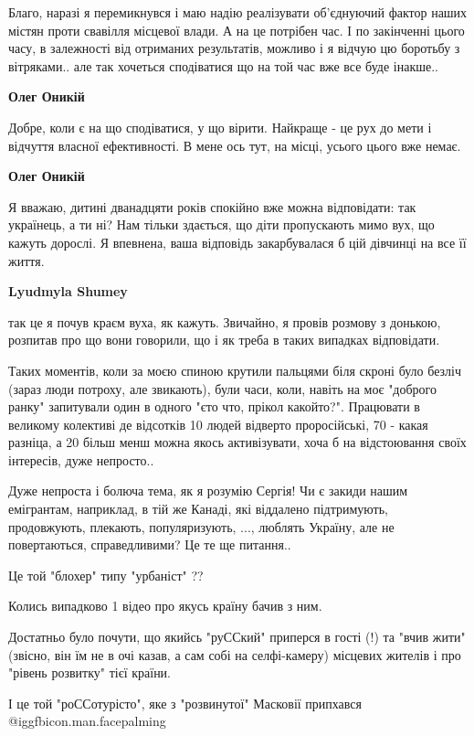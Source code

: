 \begin{itemize}
\begin{itemize}
Благо, наразі я перемикнувся і маю надію реалізувати об'єднуючий фактор наших
містян проти свавілля місцевої влади. А на це потрібен час. І по закінченні
цього часу, в залежності від отриманих результатів, можливо і я відчую цю
боротьбу з вітряками.. але так хочеться сподіватися що на той час вже все буде
інакше..

\textbf{Олег Оникій} 

Добре, коли є на що сподіватися, у що вірити. Найкраще - це рух до мети і
відчуття власної ефективності. В мене ось тут, на місці, усього цього вже
немає.

\textbf{Олег Оникій} 

Я вважаю, дитині дванадцяти років спокійно вже можна відповідати: так
українець, а ти ні? Нам тільки здається, що діти пропускають мимо вух, що
кажуть дорослі. Я впевнена, ваша відповідь закарбувалася б цій дівчинці на все
її життя.

\textbf{Lyudmyla Shumey} 

так це я почув краєм вуха, як кажуть. Звичайно, я провів розмову з донькою,
розпитав про що вони говорили, що і як треба в таких випадках відповідати.

Таких моментів, коли за моєю спиною крутили пальцями біля скроні було безліч
(зараз люди потроху, але звикають), були часи, коли, навіть на моє "доброго
ранку" запитували один в одного "єто что, прікол какойто?". Працювати в
великому колективі де відсотків 10 людей відверто проросійські, 70 - какая
разніца, а 20 більш менш можна якось активізувати, хоча б на відстоювання своїх
інтересів, дуже непросто..

Дуже непроста і болюча тема, як я розумію Сергія! Чи є закиди нашим емігрантам,
наприклад, в тій же Канаді, які віддалено підтримують, продовжують, плекають,
популяризують, ..., люблять Україну, але не повертаються, справедливими? Це те
ще питання..

\end{itemize} %


Це той "блохер" типу "урбаніст" ??

Колись випадково 1 відео про якусь країну бачив з ним.

Достатньо було почути, що якийсь "руССкий" приперся в гості (!) та "вчив жити"
(звісно, він їм не в очі казав, а сам собі на селфі-камеру) місцевих жителів і
про "рівень розвитку" тієї країни.

І це той "роССотурісто", яке з "розвинутої" Масковії припхався  @igg{fbicon.man.facepalming} 


\end{itemize}
